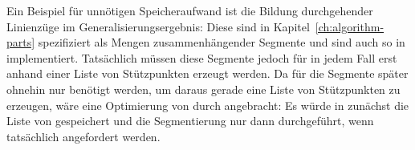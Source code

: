 \documentclass[../main/thesis.tex]{subfiles}
\begin{document}
Ein Beispiel für unnötigen Speicheraufwand ist die Bildung durchgehender Linienzüge im Generalisierungsergebnis:
Diese sind in Kapitel~\ref{ch:algorithm-parts} spezifiziert als Mengen zusammenhängender Segmente und sind auch so in  implementiert.
Tatsächlich müssen diese Segmente jedoch für  in jedem Fall erst anhand einer Liste von Stützpunkten erzeugt werden.
Da für  die Segmente später ohnehin nur benötigt werden, um daraus gerade eine Liste von Stützpunkten zu erzeugen, wäre eine Optimierung von  durch  angebracht:
Es würde in  zunächst die Liste von  gespeichert und die Segmentierung nur dann durchgeführt, wenn tatsächlich  angefordert werden.



\onlyinsubfile{\listoffigures}
\onlyinsubfile{}
\end{document}
